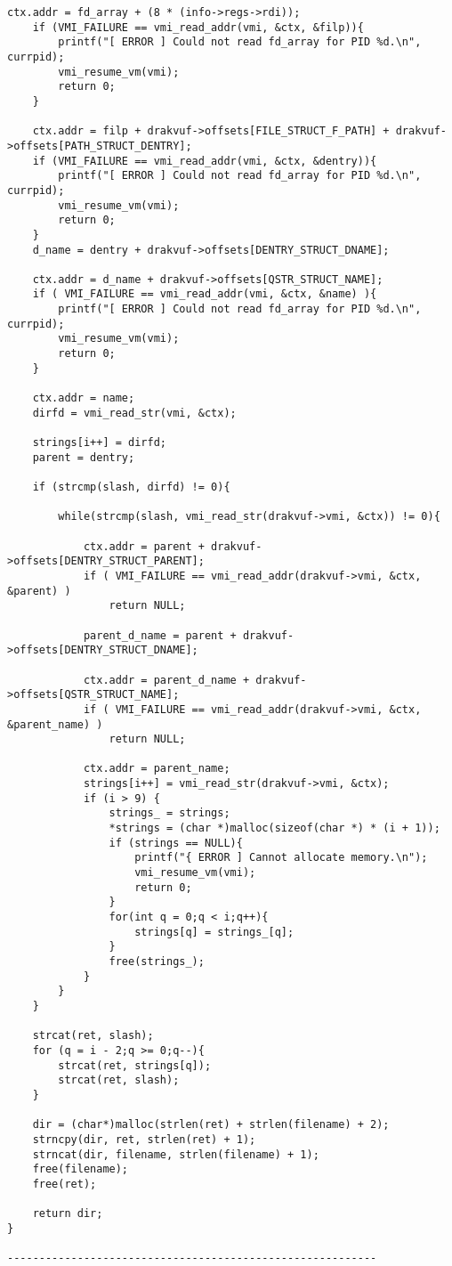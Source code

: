 {\begin{lstlisting}[style=CStyle]
	ctx.addr = fd_array + (8 * (info->regs->rdi));
	if (VMI_FAILURE == vmi_read_addr(vmi, &ctx, &filp)){
		printf("[ ERROR ] Could not read fd_array for PID %d.\n", currpid);
		vmi_resume_vm(vmi);
		return 0;
	} 
	
	ctx.addr = filp + drakvuf->offsets[FILE_STRUCT_F_PATH] + drakvuf->offsets[PATH_STRUCT_DENTRY];
	if (VMI_FAILURE == vmi_read_addr(vmi, &ctx, &dentry)){
		printf("[ ERROR ] Could not read fd_array for PID %d.\n", currpid);
		vmi_resume_vm(vmi);
		return 0;
	} 
	d_name = dentry + drakvuf->offsets[DENTRY_STRUCT_DNAME];
	
	ctx.addr = d_name + drakvuf->offsets[QSTR_STRUCT_NAME];
	if ( VMI_FAILURE == vmi_read_addr(vmi, &ctx, &name) ){
		printf("[ ERROR ] Could not read fd_array for PID %d.\n", currpid);
		vmi_resume_vm(vmi);
		return 0;
	} 
	
	ctx.addr = name;
	dirfd = vmi_read_str(vmi, &ctx);
	
	strings[i++] = dirfd;
	parent = dentry;
	
	if (strcmp(slash, dirfd) != 0){
	
		while(strcmp(slash, vmi_read_str(drakvuf->vmi, &ctx)) != 0){
		
			ctx.addr = parent + drakvuf->offsets[DENTRY_STRUCT_PARENT];
			if ( VMI_FAILURE == vmi_read_addr(drakvuf->vmi, &ctx, &parent) )
				return NULL;
			
			parent_d_name = parent + drakvuf->offsets[DENTRY_STRUCT_DNAME];
			
			ctx.addr = parent_d_name + drakvuf->offsets[QSTR_STRUCT_NAME];
			if ( VMI_FAILURE == vmi_read_addr(drakvuf->vmi, &ctx, &parent_name) )
				return NULL;
			
			ctx.addr = parent_name;
			strings[i++] = vmi_read_str(drakvuf->vmi, &ctx);
			if (i > 9) {
				strings_ = strings;
				*strings = (char *)malloc(sizeof(char *) * (i + 1));
				if (strings == NULL){
					printf("{ ERROR ] Cannot allocate memory.\n");
					vmi_resume_vm(vmi);
					return 0;
				}
				for(int q = 0;q < i;q++){
					strings[q] = strings_[q];
				}
				free(strings_);
			}
		}
	}
	
	strcat(ret, slash);
	for (q = i - 2;q >= 0;q--){
		strcat(ret, strings[q]);
		strcat(ret, slash);
	}
	
	dir = (char*)malloc(strlen(ret) + strlen(filename) + 2);
	strncpy(dir, ret, strlen(ret) + 1);
	strncat(dir, filename, strlen(filename) + 1);
	free(filename);
	free(ret);
	
	return dir;
}

----------------------------------------------------------


\end{lstlisting}}
